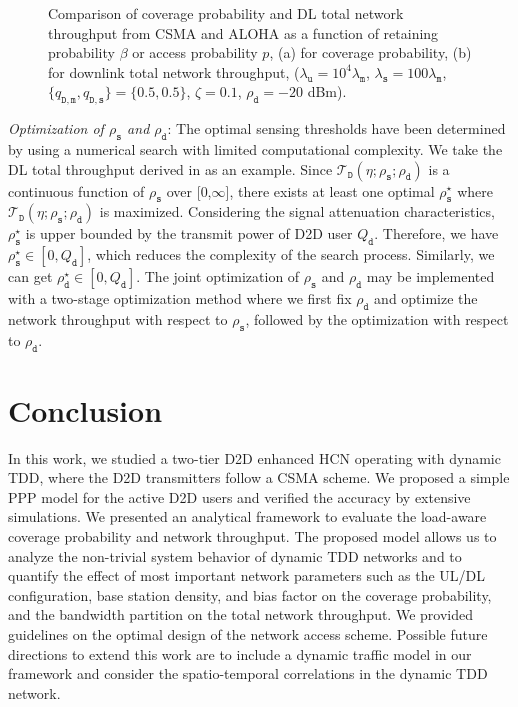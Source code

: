 \documentclass[twocolumn,english]{IEEEtran}
\theoremstyle{plain}
\theoremstyle{definition}
\begin{document}
\begin{figure}[t]


\protect\caption{\label{fig:CSMA_ALOHA_Compare}Comparison of coverage probability
and DL total network throughput from CSMA and ALOHA as a function
of retaining probability $\beta$ or access probability $p$, (a)
for coverage probability, (b) for downlink total network throughput,
($\lambda_{\mathtt{u}}=10^{4}\lambda_{\mathtt{m}}$, $\lambda_{\mathtt{s}}=100\lambda_{\mathtt{m}}$,
$\{q_{\mathtt{D,m}},q_{\mathtt{D,s}}\}=\{0.5,0.5\}$, $\zeta=0.1$,
$\rho_{\mathtt{d}}=-20$ dBm). }
\end{figure}


\emph{Optimization of $\rho_{\mathtt{s}}$ and $\rho_{\mathtt{d}}$}:
The optimal sensing thresholds have been determined by using a numerical
search with limited computational complexity. We take the DL total
throughput derived in  as an example. Since
$\mathcal{T}_{\mathtt{D}}(\eta;\rho_{\mathtt{s}};\rho_{\mathtt{d}})$
is a continuous function of $\rho_{\mathtt{s}}$ over {[}0,$\infty${]},
there exists at least one optimal $\rho_{\mathtt{s}}^{\star}$ where
$\mathcal{T}_{\mathtt{D}}(\eta;\rho_{\mathtt{s}};\rho_{\mathtt{d}})$
is maximized. Considering the signal attenuation characteristics,
$\rho_{\mathtt{s}}^{\star}$ is upper bounded by the transmit power
of D2D user $Q_{\mathtt{d}}$. Therefore, we have $\rho_{\mathtt{s}}^{\star}\in[0,Q_{\mathtt{d}}]$,
which reduces the complexity of the search process. Similarly, we
can get $\rho_{\mathtt{d}}^{\star}\in[0,Q_{\mathtt{d}}]$. The joint
optimization of $\rho_{\mathtt{s}}$ and $\rho_{\mathtt{d}}$ may
be implemented with a two-stage optimization method where we first
fix $\rho_{\mathtt{d}}$ and optimize the network throughput with
respect to $\rho_{\mathtt{s}}$, followed by the optimization with
respect to $\rho_{\mathtt{d}}$.


\section{Conclusion}

In this work, we studied a two-tier D2D enhanced HCN operating with
dynamic TDD, where the D2D transmitters follow a CSMA scheme. We proposed
a simple PPP model for the active D2D users and verified the accuracy
by extensive simulations. We presented an analytical framework to
evaluate the load-aware coverage probability and network throughput.
The proposed model allows us to analyze the non-trivial system behavior
of dynamic TDD networks and to quantify the effect of most important
network parameters such as the UL/DL configuration, base station density,
and bias factor on the coverage probability, and the bandwidth partition
on the total network throughput. We provided guidelines on the optimal
design of the network access scheme. Possible future directions to
extend this work are to include a dynamic traffic model in our framework
and consider the spatio-temporal correlations in the dynamic TDD network.
\end{document}

